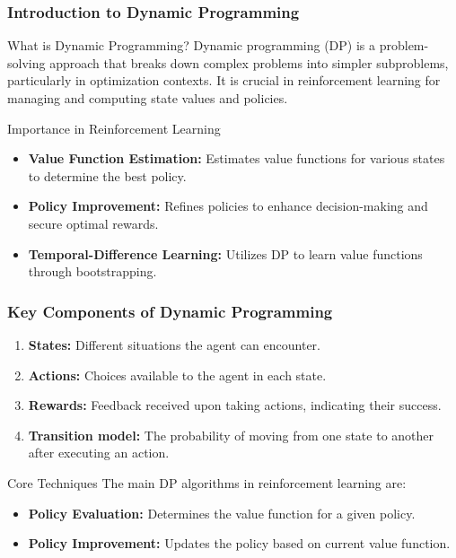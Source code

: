 \documentclass[aspectratio=169]{beamer}
\begin{document}
\frame{\titlepage}

\begin{frame}[fragile]
    \frametitle{Introduction to Dynamic Programming}
    \begin{block}{What is Dynamic Programming?}
        Dynamic programming (DP) is a problem-solving approach that breaks down complex problems into simpler subproblems, particularly in optimization contexts. It is crucial in reinforcement learning for managing and computing state values and policies.
    \end{block}

    \begin{block}{Importance in Reinforcement Learning}
        \begin{itemize}
            \item \textbf{Value Function Estimation:} Estimates value functions for various states to determine the best policy.
            \item \textbf{Policy Improvement:} Refines policies to enhance decision-making and secure optimal rewards.
            \item \textbf{Temporal-Difference Learning:} Utilizes DP to learn value functions through bootstrapping.
        \end{itemize}
    \end{block}
\end{frame}

\begin{frame}[fragile]
    \frametitle{Key Components of Dynamic Programming}
    \begin{enumerate}
        \item \textbf{States:} Different situations the agent can encounter.
        \item \textbf{Actions:} Choices available to the agent in each state.
        \item \textbf{Rewards:} Feedback received upon taking actions, indicating their success.
        \item \textbf{Transition model:} The probability of moving from one state to another after executing an action.
    \end{enumerate}
    
    \begin{block}{Core Techniques}
        The main DP algorithms in reinforcement learning are:
        \begin{itemize}
            \item \textbf{Policy Evaluation:} Determines the value function for a given policy.
            \item \textbf{Policy Improvement:} Updates the policy based on current value function.
        \end{itemize}
    \end{block}
\end{frame}
\end{document}
